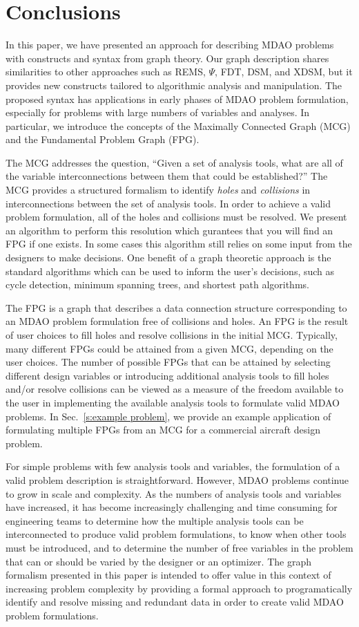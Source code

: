 \section*{Conclusions}
In this paper, we have presented an approach for describing MDAO problems with constructs and syntax from graph theory. 
Our graph description shares similarities to other approaches such as REMS, $\Psi$, FDT, 
DSM, and XDSM, but it provides new constructs tailored to algorithmic analysis and 
manipulation. The proposed syntax has applications in early phases of MDAO problem 
formulation, especially for problems with large numbers of variables and analyses. 
In particular, we introduce the concepts of the Maximally Connected Graph (MCG) and 
the Fundamental Problem Graph (FPG). 

The MCG addresses the question, ``Given a set of analysis tools, 
what are all of the variable interconnections between them that could be established?''  
The MCG provides a structured formalism to identify \textit{holes} and 
\textit{collisions} in interconnections between the set of analysis tools. 
In order to achieve a valid problem formulation, all of the holes and collisions must 
be resolved. We present an algorithm to perform this resolution which gurantees that you 
will find an FPG if one exists. In some cases this algorithm still relies on some input from the 
designers to make decisions. One benefit of a graph theoretic approach is the standard 
algorithms which can be used to inform the user's decisions, such as cycle detection, 
minimum spanning trees, and shortest path algorithms.


The FPG is a graph that describes a data connection structure corresponding 
to an MDAO problem formulation free of collisions and holes. 
An FPG is the result of user choices to fill holes and resolve collisions in 
the initial MCG. Typically, many different FPGs could be attained from a given MCG, 
depending on the user choices. The number of possible FPGs that can be attained by 
selecting different design variables or introducing additional analysis tools to 
fill holes and/or resolve collisions can be viewed as a measure of the freedom 
available to the user in implementing the available analysis tools to 
formulate valid MDAO problems. In Sec.~\ref{s:example problem}, 
we provide an example application of formulating multiple FPGs from an MCG 
for a commercial aircraft design problem. 


For simple problems with few analysis tools and variables, the formulation of a 
valid problem description is straightforward. However, MDAO problems continue to 
grow in scale and complexity. As the numbers of analysis tools and variables have 
increased, it has become increasingly challenging and time consuming for engineering 
teams to determine how the multiple analysis tools can be interconnected to produce 
valid problem formulations, to know when other tools must be introduced, and to 
determine the number of free variables in the problem that can or should be 
varied by the designer or an optimizer. The graph formalism presented in this 
paper is intended to offer value in this context of increasing problem complexity by 
providing a formal approach to programatically identify and resolve missing and 
redundant data in order to create valid MDAO problem formulations.  